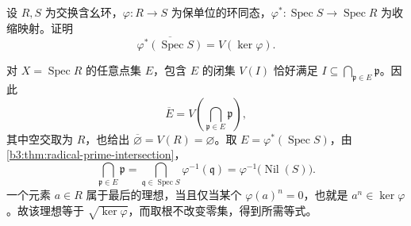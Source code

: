 \begin{exercise}\label{b3:ex:01-spectrum-image-closure}
	设 \(R,S\) 为交换含幺环，\(\varphi:R\rightarrow S\) 为保单位的环同态，\(\varphi^*:\operatorname{Spec}S\rightarrow\operatorname{Spec}R\) 为收缩映射。证明
	\[
		\overline{\varphi^*(\operatorname{Spec}S)}=V(\ker\varphi).
	\]
\end{exercise}
\begin{solution}
	对 \(X=\operatorname{Spec}R\) 的任意点集 \(E\)，包含 \(E\) 的闭集 \(V(I)\) 恰好满足 \(I\subseteq\bigcap_{\mathfrak p\in E}\mathfrak p\)。因此
	\[
		\overline E=V\!\left(\bigcap_{\mathfrak p\in E}\mathfrak p\right),
	\]
	其中空交取为 \(R\)，也给出 \(\overline\varnothing=V(R)=\varnothing\)。取 \(E=\varphi^*(\operatorname{Spec}S)\)，由\cref{b3:thm:radical-prime-intersection}，
	\[
		\bigcap_{\mathfrak p\in E}\mathfrak p =\bigcap_{\mathfrak q\in\operatorname{Spec}S}\varphi^{-1}(\mathfrak q) =\varphi^{-1}\bigl(\operatorname{Nil}(S)\bigr).
	\]
	一个元素 \(a\in R\) 属于最后的理想，当且仅当某个 \(\varphi(a)^n=0\)，也就是 \(a^n\in\ker\varphi\)。故该理想等于 \(\sqrt{\ker\varphi}\)，而取根不改变零集，得到所需等式。
\end{solution}
